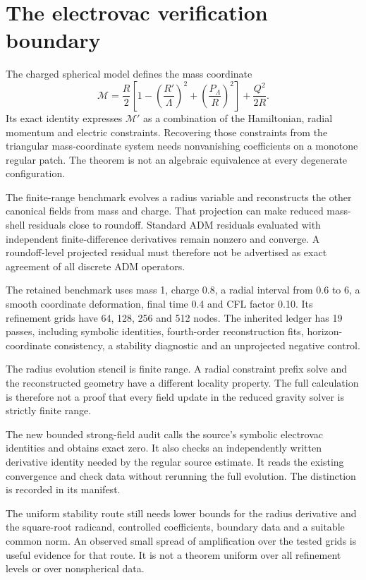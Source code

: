 \clearpage
\section{The electrovac verification boundary}\label{c:verify:electrovac}

The charged spherical model defines the mass coordinate
\[
 \mathcal M=\frac R2\left[
 1-\left(\frac{R'}\Lambda\right)^2
 +\left(\frac{P_\Lambda}R\right)^2\right]
 +\frac{Q^2}{2R}.
\]
Its exact identity expresses \(\mathcal M'\) as a combination of the Hamiltonian, radial momentum and electric constraints. Recovering those constraints from the triangular mass-coordinate system needs nonvanishing coefficients on a monotone regular patch. The theorem is not an algebraic equivalence at every degenerate configuration.

The finite-range benchmark evolves a radius variable and reconstructs the other canonical fields from mass and charge. That projection can make reduced mass-shell residuals close to roundoff. Standard ADM residuals evaluated with independent finite-difference derivatives remain nonzero and converge. A roundoff-level projected residual must therefore not be advertised as exact agreement of all discrete ADM operators.

The retained benchmark uses mass 1, charge 0.8, a radial interval from 0.6 to 6, a smooth coordinate deformation, final time 0.4 and CFL factor 0.10. Its refinement grids have 64, 128, 256 and 512 nodes. The inherited ledger has 19 passes, including symbolic identities, fourth-order reconstruction fits, horizon-coordinate consistency, a stability diagnostic and an unprojected negative control.

The radius evolution stencil is finite range. A radial constraint prefix solve and the reconstructed geometry have a different locality property. The full calculation is therefore not a proof that every field update in the reduced gravity solver is strictly finite range.

The new bounded strong-field audit calls the source's symbolic electrovac identities and obtains exact zero. It also checks an independently written derivative identity needed by the regular source estimate. It reads the existing convergence and check data without rerunning the full evolution. The distinction is recorded in its manifest.

The uniform stability route still needs lower bounds for the radius derivative and the square-root radicand, controlled coefficients, boundary data and a suitable common norm. An observed small spread of amplification over the tested grids is useful evidence for that route. It is not a theorem uniform over all refinement levels or over nonspherical data.




